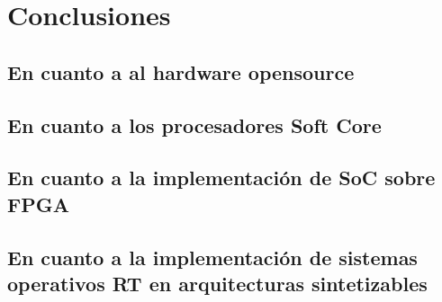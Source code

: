  \chapter{Conclusiones}

	\section{En cuanto a al hardware opensource}
	 

	\section{En cuanto a los procesadores Soft Core} 
	
	
	
	\section{En cuanto a la implementación de SoC sobre FPGA} 
		
		
	\section{En cuanto a la implementación de sistemas operativos RT en arquitecturas sintetizables} 
		
